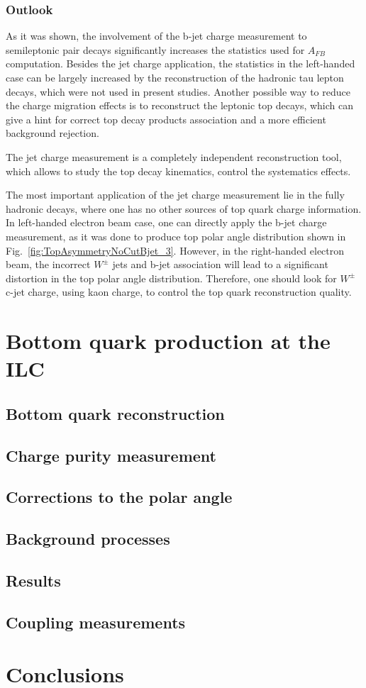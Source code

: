 \subsubsection{Outlook}
As it was shown, the involvement of the b-jet charge measurement to semileptonic \ttbar pair decays significantly increases the statistics used for $A_{FB}$ computation.
Besides the jet charge application, the statistics in the left-handed case can be largely increased by the reconstruction of the hadronic tau lepton decays, which were not used in present studies. 
Another possible way to reduce the charge migration effects is to reconstruct the leptonic top decays, which can give a hint for correct top decay products association and a more efficient background rejection.

The jet charge measurement is a completely independent reconstruction tool, which allows to study the top decay kinematics, control the systematics effects.

The most important application of the jet charge measurement lie in the fully hadronic \ttbar decays, where one has no other sources of top quark charge information. 
In left-handed electron beam case, one can directly apply the b-jet charge measurement, as it was done to produce top polar angle distribution shown in Fig.~\ref{fig:TopAsymmetryNoCutBjet_3}. 
However, in the right-handed electron beam, the incorrect $W^\pm$ jets and b-jet association will lead to a significant distortion in the top polar angle distribution. Therefore, one should look for $W^\pm$ c-jet charge, using kaon charge, to control the top quark reconstruction quality. 

\section{Bottom quark production at the ILC}

\subsection{Bottom quark reconstruction}
\subsection{Charge purity measurement}
\label{sec:ChargePurity}
\subsection{Corrections to the polar angle}
\subsection{Background processes}
\subsection{Results}
\label{sec:BBBarresults}
\subsection{Coupling measurements}
\section*{Conclusions}